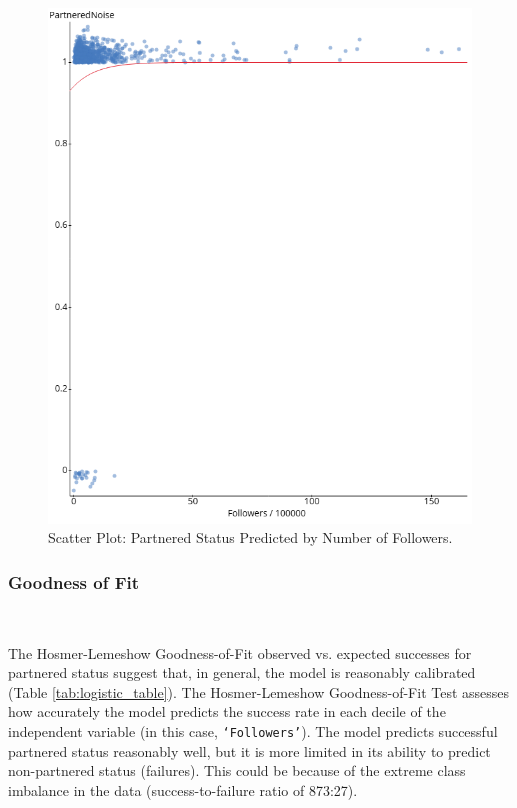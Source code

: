 \documentclass[12pt]{article}
\begin{document}
\begin{figure}[H]
\centering
	\includegraphics[height=0.52\textheight]{../StatCrunch_Results/logit_partnered_followers/scatter_plot}
	\captionsetup{justification=centering, singlelinecheck=false, margin=2cm}
	\caption[Scatter Plot: Partnered Status Predicted by Number of Followers]{Scatter Plot: Partnered Status Predicted by Number of Followers.}
	\label{fig:logit_partnered_followers}
\end{figure}

\subsubsection{Goodness of Fit}\

The Hosmer-Lemeshow Goodness-of-Fit observed vs. expected successes for partnered status suggest that, in general, the model is reasonably calibrated (Table \ref{tab:logistic_table}). The Hosmer-Lemeshow Goodness-of-Fit Test assesses how accurately the model predicts the success rate in each decile of the independent variable (in this case, \texttt{`Followers'}). The model predicts successful partnered status reasonably well, but it is more limited in its ability to predict non-partnered status (failures). This could be because of the extreme class imbalance in the data (success-to-failure ratio of 873:27).
\end{document}
